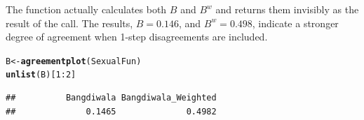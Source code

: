 \documentclass[11pt]{book}\usepackage[]{graphicx}\usepackage[]{color}
\makeatletter
\newcommand{\hlnum}[1]{\textcolor[rgb]{0.686,0.059,0.569}{#1}}%
\newcommand{\hlopt}[1]{\textcolor[rgb]{0,0,0}{#1}}%
\newcommand{\hlstd}[1]{\textcolor[rgb]{0.345,0.345,0.345}{#1}}%
\newcommand{\hlkwb}[1]{\textcolor[rgb]{0.69,0.353,0.396}{#1}}%
\newcommand{\hlkwd}[1]{\textcolor[rgb]{0.737,0.353,0.396}{\textbf{#1}}}%
\newenvironment{kframe}{%
 \def\at@end@of@kframe{}%
 \ifinner\ifhmode%
  \def\at@end@of@kframe{\end{minipage}}%
  \begin{minipage}{\columnwidth}%
 \fi\fi%
 \def\FrameCommand##1{\hskip\@totalleftmargin \hskip-\fboxsep
 \colorbox{shadecolor}{##1}\hskip-\fboxsep
     \hskip-\linewidth \hskip-\@totalleftmargin \hskip\columnwidth}%
 \MakeFramed {\advance\hsize-\width
   \@totalleftmargin\z@ \linewidth\hsize
   \@setminipage}}%
 {\par\unskip\endMakeFramed%
 \at@end@of@kframe}
\newenvironment{knitrout}{}{} %
\renewenvironment{knitrout}{\small\renewcommand{\baselinestretch}{.85}}{} %
\makeatother
\begin{document}
The function  actually calculates both $B$ and $B^w$
and returns them invisibly as the result of the call.
The results, $B = 0.146$, and $B^w = 0.498$, indicate a stronger
degree of agreement when 1-step disagreements are included.
\begin{knitrout}
\color{fgcolor}\begin{kframe}
\begin{alltt}
\hlstd{B} \hlkwb{<-}\hlkwd{agreementplot}\hlstd{(SexualFun)}
\hlkwd{unlist}\hlstd{(B)[}\hlnum{1}\hlopt{:}\hlnum{2}\hlstd{]}
\end{alltt}
\begin{verbatim}
##          Bangdiwala Bangdiwala_Weighted 
##              0.1465              0.4982
\end{verbatim}
\end{kframe}
\end{knitrout}
\end{document}
